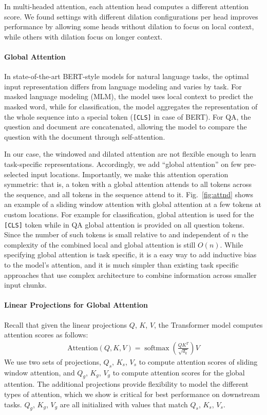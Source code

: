 \documentclass[11pt,a4paper]{article}
\begin{document}
In multi-headed attention, each attention head computes a different attention score.  We found settings with different dilation configurations per head improves performance by allowing some heads without dilation to focus on local context, while others with dilation focus on longer context.

\paragraph{Global Attention} 

In state-of-the-art BERT-style models for natural language tasks, the optimal input representation differs from language modeling and varies by task.
For masked language modeling (MLM), the model uses local context to predict the masked word, while for classification, the model aggregates the representation of the whole sequence into a special token (\texttt{[CLS]} in case of BERT).
For QA, the question and document are concatenated, allowing the model to compare the question with the document through self-attention.

In our case, the windowed and dilated attention are not flexible enough to learn task-specific representations.
Accordingly, we add ``global attention'' on few pre-selected input locations.
Importantly, we make this attention operation symmetric: that is, a token
with a global attention attends to all tokens across the sequence, and all tokens in the sequence attend to it. 
Fig.~\ref{fig:attnd} shows an example of a sliding window attention
with global attention at a few tokens at custom locations. For example for classification, global attention is used for the \texttt{[CLS]} token while in QA global attention is provided on all question tokens.
Since the number of such tokens is small relative to and independent of $n$
the complexity of the combined local and global attention is still $O(n)$.
While specifying global attention is task specific, it is a easy way to add inductive bias to the model's attention, and it is much simpler than existing task specific approaches that use complex architecture to combine information across smaller input chunks.

\paragraph{Linear Projections for Global Attention}
Recall that given the linear projections $Q$, $K$, $V$, the Transformer
model \cite{Vaswani2017AttentionIA} computes attention scores as follows:
\begin{align}
\label{eq:qkv}
\text {Attention}(Q, K, V)=\operatorname{softmax}\left(\frac{Q K^{T}}{\sqrt{d_{k}}}\right) V
\end{align}
We use two sets of projections, $Q_s$, $K_s$, $V_s$ to compute attention scores of sliding window attention, and  $Q_g$, $K_g$, $V_g$ to  compute attention scores for the global attention.
The additional projections provide flexibility to model the different types of attention, which we show is critical for best performance on downstream tasks. 
$Q_g$, $K_g$, $V_g$ are all initialized with values that match
 $Q_s$, $K_s$, $V_s$. 
\end{document}
